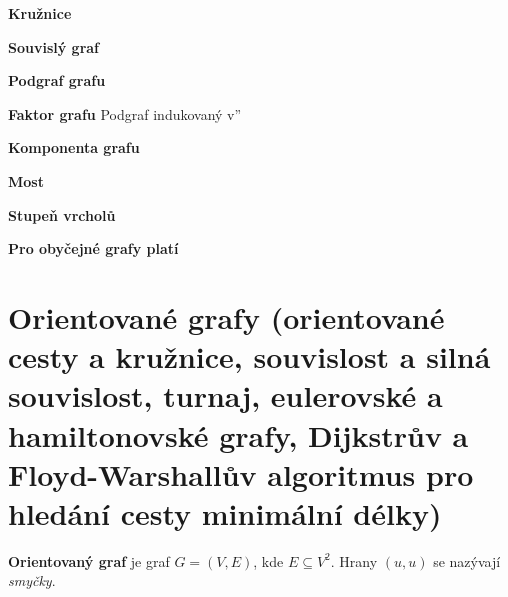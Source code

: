 \documentclass[11pt,a4paper]{article}
\begin{document}
\textbf{Kružnice}

\textbf{Souvislý graf}

\textbf{Podgraf grafu}

\textbf{Faktor grafu} Podgraf indukovaný v''

\textbf{Komponenta grafu}

\textbf{Most}

\textbf{Stupeň vrcholů}

\textbf{Pro obyčejné grafy platí}
\section{Orientované grafy (orientované cesty a kružnice, souvislost a silná souvislost, turnaj, eulerovské a hamiltonovské grafy, Dijkstrův a Floyd-Warshallův algoritmus pro hledání cesty minimální délky)}

\textbf{Orientovaný graf} je graf $G = (V, E)$, kde $E \subseteq V^2$. Hrany $(u,u)$ se nazývají \textit{smyčky}.
\end{document}
